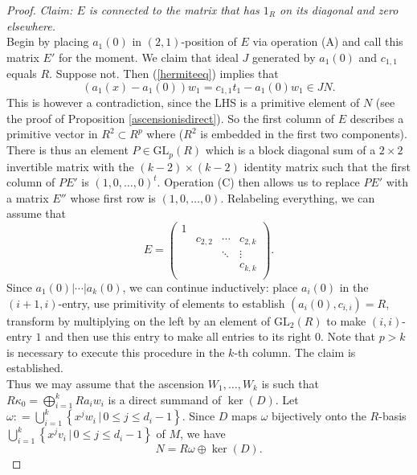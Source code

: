 \documentclass[11pt]{article}
\theoremstyle{definition}
\numberwithin{equation}{section}
\newcommand{\GL}{\mathrm{GL}}
\begin{document}
\begin{proof}
\noindent \textit{Claim:  $ E $ is connected to the matrix that has $ 1_{R} $ on its diagonal and zero elsewhere.} \\
Begin by placing $ a_{1}(0) $ in $ (2, 1) $-position of $ E $ via operation (A) and call this matrix $ E '$ for the moment.  We claim that ideal $ J $  generated by $ a_{1} (0) $ and $ c_{1,1} $ equals $ R $. Suppose not.  
Then  (\ref{hermiteeq})  implies that $$ \left ( a_{1}(x) - a_{1}(0) \right ) w_{1} = c_{1,1} t_{1} -  a_{1}(0) w_{1}  \in J N . $$ 
This is however a contradiction, since the LHS is a primitive element of $ N $ (see the proof of Proposition \ref{ascensionisdirect}). So the first column of $ E $ describes a primitive vector in $ R^{2} \subset  R^{p} $ where ($ R^{2} $ is embedded in the first two components).   There is thus an element $ P \in  \GL_{p}(R) $ which is a block diagonal sum of a $ 2 \times 2 $ invertible matrix with the $ (k-2) \times (k-2)$ identity matrix such that the first column of $ PE' $ is $ (1,0, \ldots, 0)^{t} $. Operation (C) then allows us to replace $ PE' $ with a matrix $ E'' $ whose first row is $ (1, 0, \ldots, 0) $. Relabeling everything, we can assume that $$ E =      \left (  \begin{matrix} 1  &   & %
&  \\
& c_{2,2} & \cdots & c_{2,k} \\
 &  &  \ddots & \vdots  \\
 &  & & c_{k,k} \\
 & 
\end{matrix}  \right   )  . $$
Since $ a_{1}(0) | \cdots | a_{k}(0) $, we can continue inductively:   place $ a_{i}(0) $ in the $ (i+1, i)$-entry, use primitivity of elements to establish $ (a_{i}(0), c_{i,i}) = R $, transform by multiplying on the left by an element of $ \GL_{2}(R) $ to make $ (i,i)$-entry $ 1 $ and then use this entry to make all entries to its right $ 0 $. Note that $ p > k $ is necessary to execute this procedure in the $ k $-th  column.    The claim  is   established.   \\[1em] 
Thus we may assume that the ascension $ W_{1} ,  \ldots , W_{k } $ is such that $ R \kappa_{0} = \bigoplus_{i=1}^{k} R a_{i}w_{i}  $ is a direct summand of $ \ker(D) $. Let 
$ \omega  : =  \bigcup_{i=1}^{k} \left \{  x^{j} w_{i} \, | \, 0 \leq j \leq d_{i} -1 \right \} $. Since $ D $ maps $\omega $ bijectively onto the $ R$-basis $ \bigcup_{i=1}^k \left \{ x^{j} v_{i} \, | \, 0 \leq j \leq d_{i}-1     \right \} $ of $ M $,  we have $$ N =  R \omega  \oplus \ker (D)   . $$ 

\end{proof}
\end{document}
